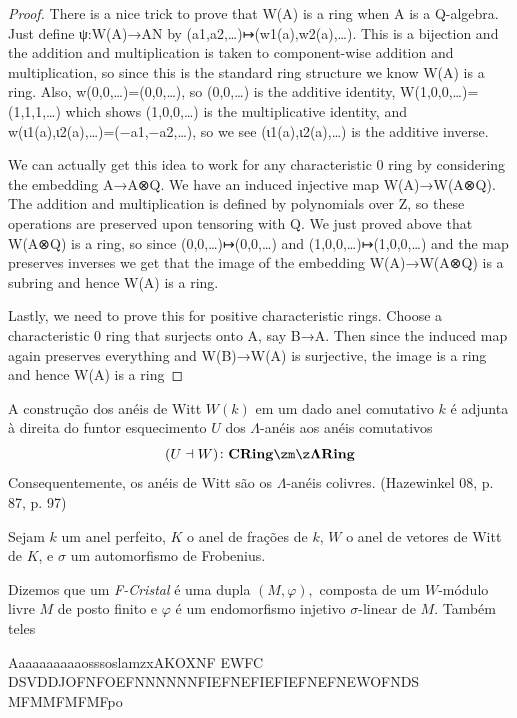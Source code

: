 \documentclass[11pt,twoside,a4paper]{book}
\begin{document}
\begin{proof}
There is a nice trick to prove that W(A) is a ring when A is a Q-algebra. Just define ψ:W(A)→AN by (a1,a2,…)↦(w1(a),w2(a),…). This is a bijection and the addition and multiplication is taken to component-wise addition and multiplication, so since this is the standard ring structure we know W(A) is a ring. Also, w(0,0,…)=(0,0,…), so (0,0,…) is the additive identity, W(1,0,0,…)=(1,1,1,…) which shows (1,0,0,…) is the multiplicative identity, and w(ι1(a),ι2(a),…)=(−a1,−a2,…), so we see (ι1(a),ι2(a),…) is the additive inverse.

We can actually get this idea to work for any characteristic 0 ring by considering the embedding A→A⊗Q. We have an induced injective map W(A)→W(A⊗Q). The addition and multiplication is defined by polynomials over Z, so these operations are preserved upon tensoring with Q. We just proved above that W(A⊗Q) is a ring, so since (0,0,…)↦(0,0,…) and (1,0,0,…)↦(1,0,0,…) and the map preserves inverses we get that the image of the embedding W(A)→W(A⊗Q) is a subring and hence W(A) is a ring.

Lastly, we need to prove this for positive characteristic rings. Choose a characteristic 0 ring that surjects onto A, say B→A. Then since the induced map again preserves everything and W(B)→W(A) is surjective, the image is a ring and hence W(A) is a ring
\end{proof}

\begin{proposicao}
A construção dos anéis de Witt $W(k)$ em um dado anel comutativo $k$ é adjunta à direita do funtor esquecimento $U$ dos $\Lambda$-anéis aos anéis comutativos
\[
(U \dashv W) \colon \mathbf{CRing} \zm\z \mathbf{\Lambda Ring}
\]
Consequentemente, os anéis de Witt são os $\Lambda$-anéis colivres. (Hazewinkel 08, p. 87, p. 97)
\end{proposicao}
\begin{definicao}
Sejam $k$ um anel perfeito, $K$ o anel de frações de $k$, $W$ o anel de vetores de Witt de $K$, e $\sigma$ um automorfismo de Frobenius.

Dizemos que um \emph{F-Cristal} é uma dupla $(M, \varphi),$ composta de um $W$-módulo livre $M$ de posto finito e $\varphi$ é um endomorfismo injetivo $\sigma$-linear de $M.$
Também teles
\end{definicao}
AaaaaaaaaaosssoslamzxAKOXNF EWFC DSVDDJOFNFOEFNNNNNNFIEFNEFIEFIEFNEFNEWOFNDS  MFMMFMFMFpo
\begin{exemplo}
\end{exemplo}
\end{document}
